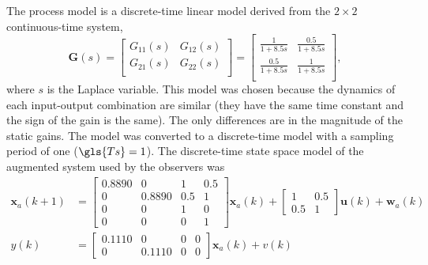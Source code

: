 The process model is a discrete-time linear model derived from the $2\times2$ continuous-time system,
\begin{equation} \label{eq:sim-sys-mimo-ct}
	\mathbf{G}(s) = \left[\begin{array}{cc}
		G_{11}(s) & G_{12}(s)  \\
		G_{21}(s) & G_{22}(s)  \\
	\end{array}\right] = \left[\begin{array}{cc}
		\frac{1}{1+8.5s} & \frac{0.5}{1+8.5s}  \\
		\frac{0.5}{1+8.5s} & \frac{1}{1+8.5s}  \\
	\end{array}\right],
\end{equation}
where $s$ is the Laplace variable.  This model was chosen because the dynamics of each input-output combination are similar (they have the same time constant and the sign of the gain is the same). The only differences are in the magnitude of the static gains. The model was converted to a discrete-time model with a sampling period of one ($\gls{Ts}=1$). The discrete-time state space model of the augmented system used by the observers was
\begin{equation} \label{eq:sim-sys-2x2-ss-aug}
	\begin{split}
		\mathbf{x}_{a}(k+1) & =\left[\begin{array}{cccc}
			0.8890 & 0 & 1 & 0.5 \\
			0 & 0.8890 & 0.5 & 1 \\
			0 & 0 & 1 & 0 \\
			0 & 0 & 0 & 1
		\end{array}\right] \mathbf{x}_{a}(k) + \left[\begin{array}{cc}
			1 & 0.5 \\
			0.5 & 1
		\end{array}\right] \mathbf{u}(k) + \mathbf{w}_{a}(k) \\
		y(k) & =\left[\begin{array}{cccc}
			0.1110 & 0 & 0 & 0 \\
			0 & 0.1110 & 0 & 0
		\end{array}\right] \mathbf{x}_{a}(k) + v(k)
	\end{split}
\end{equation}
